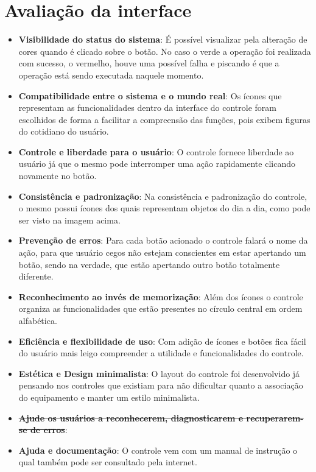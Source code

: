 \documentclass[12pt,a4paper]{article} \usepackage[utf8]{inputenc}
\begin{document}
\section{Avaliação da interface}
\begin{itemize}
	\item \textbf{Visibilidade do status
		do sistema}: É possível visualizar pela alteração de cores quando é
			clicado sobre o botão.  No caso o verde a operação foi realizada com
			sucesso, o vermelho, houve uma possível falha e piscando é que a operação
			está sendo executada naquele momento.
	\item \textbf{Compatibilidade entre o sistema e o mundo real}: Os ícones que
		representam as funcionalidades dentro da interface do controle foram
		escolhidos de forma a facilitar a compreensão das funções, pois exibem
		figuras do cotidiano do usuário.
	\item \textbf{Controle e liberdade para o usuário}: O controle fornece
		liberdade ao usuário já que o mesmo pode interromper uma ação rapidamente
		clicando novamente no botão.
	\item \textbf{Consistência e padronização}: Na consistência e padronização do
		controle, o mesmo possui ícones dos quais representam objetos do dia a dia,
		como pode ser visto na imagem acima.
	\item \textbf{Prevenção de erros}: Para cada botão acionado o controle falará
		o nome da ação, para que usuário cegos não estejam conscientes em estar
		apertando um botão, sendo na verdade, que estão apertando outro botão
		totalmente diferente.
	\item \textbf{Reconhecimento ao invés de memorização}: Além dos ícones o
		controle organiza as funcionalidades que estão presentes no círculo central
		em ordem alfabética.
	\item \textbf{Eficiência e flexibilidade de uso}: Com adição de ícones e
		botões fica fácil do usuário mais leigo compreender a utilidade e
		funcionalidades do controle.
	\item \textbf{Estética e Design minimalista}: O layout do controle foi
		desenvolvido já pensando nos controles que existiam para não dificultar
		quanto a associação do equipamento e manter um estilo minimalista.
	\item \textbf{\sout{Ajude os usuários a reconhecerem, diagnosticarem e
		recuperarem-se de erros}}:
	\item \textbf{Ajuda e documentação}: O controle vem com um manual de
		instrução o qual também pode ser consultado pela internet.
\end{itemize}
\end{document}
